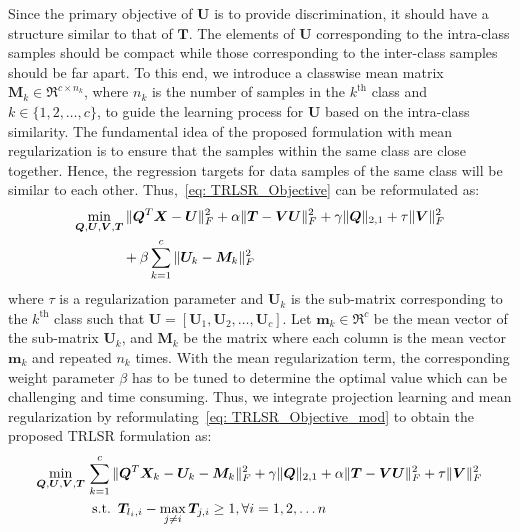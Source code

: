 Since the primary objective of $\bm{U}$ is to provide discrimination, it should have a structure similar to that of $\bm{T}$. The elements of $\bm{U}$ corresponding to the intra-class samples should be compact while those corresponding to the inter-class samples should be far apart. To this end, we introduce a classwise mean matrix $\bm{M}_{k} \in \Re^{c \times n_{k}}$, where $n_{k}$ is the number of samples in the $k^{\text{th}}$ class and $k \in \{ 1,2,\dots, c\}$, to guide the learning process for $\bm{U}$ based on the intra-class similarity. The fundamental idea of the proposed formulation with mean regularization is to ensure that the samples within the same class are close together. Hence, the regression targets for data samples of the same class will be similar to each other. Thus,~\eqref{eq: TRLSR_Objective} can be reformulated as:
%
\begin{equation}
    \label{eq: TRLSR_Objective_mod}
    \begin{split}
         & \underset{\bm{Q},\bm{U},\bm{V}, \bm{T} }{\min} \, \|  \bm{Q}^{T}\bm{X} - \bm{U} \|_{F}^{2} + \alpha \| \bm{T} - \bm{V} \bm{U}\|_{F}^{2} + \gamma \| \bm{Q}\|_{2,1} + \tau \| \bm{V} \|_{F}^{2}  \\
         & \hspace{1.2cm} + \beta \sum_{k=1}^{c}  \| \bm{U}_{k} - \bm{M}_{k} \|_{F}^{2}
         \end{split}
\end{equation}
%
where $\tau$ is a regularization parameter and $\bm{U}_{k}$ is the sub-matrix corresponding to the $k^{\text{th}}$ class such that $\bm{U} = \left[\bm{U}_{1}, \bm{U}_{2},\dots,\bm{U}_{c}\right]$. Let $\bm{m}_{k} \in \Re^{c}$ be the mean vector of the sub-matrix $\bm{U}_{k}$, and $\bm{M}_{k}$ be the matrix where each column is the mean vector $\bm{m}_{k}$ and repeated $n_{k}$ times.
%
With the mean regularization term, the corresponding weight parameter $\beta$ has to be tuned to determine the optimal value which can be challenging and time consuming. Thus, we integrate projection learning and mean regularization by reformulating~\eqref{eq: TRLSR_Objective_mod} to obtain the proposed TRLSR formulation as:
%
\begin{equation}
\begin{split}
    \label{eq: TRLSR Final_Objective}
     & \underset{\bm{Q},\bm{U},\bm{V},\bm{T}}{\min} \, \sum_{k=1}^{c} \| \bm{Q}^{T}\bm{X}_{k} - \bm{U}_{k} - \bm{M}_{k} \|_{F}^{2} + \gamma \| \bm{Q}\|_{2,1}  + \alpha  \| \bm{T} - \bm{V} \bm{U}\|_{F}^{2}   + \tau \| \bm{V} \|_{F}^{2} \\
      & \hspace{1.4cm} \text{s.t.} \enskip \bm{T}_{{l}_{i}, i}  - \max_{j \neq i} \bm{T}_{j,i} \geq 1, \forall i = 1,2,\dots n
\end{split}    
\end{equation}
